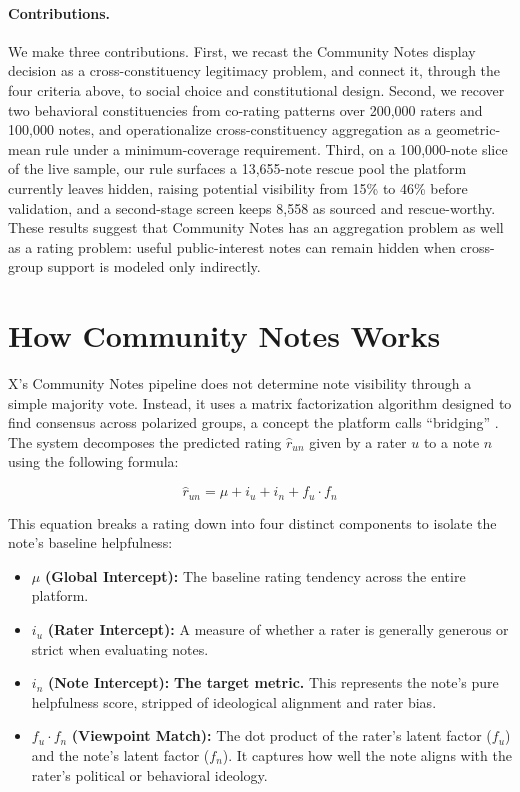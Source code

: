 \documentclass[10pt,twocolumn]{article}
\begin{document}
\paragraph{Contributions.} We make three contributions. First, we recast the
Community Notes display decision as a cross-constituency legitimacy problem, and
connect it, through the four criteria above, to social choice and constitutional
design. Second, we recover two behavioral constituencies from co-rating patterns
over 200,000 raters and 100,000 notes, and operationalize cross-constituency
aggregation as a geometric-mean rule under a minimum-coverage requirement. Third,
on a 100,000-note slice of the live sample, our rule surfaces a 13,655-note rescue
pool the platform currently leaves hidden, raising potential visibility from 15\%
to 46\% before validation, and a second-stage screen keeps 8,558 as sourced and
rescue-worthy. These results suggest that Community Notes has an
aggregation problem as well as a rating problem: useful public-interest notes can
remain hidden when cross-group support is modeled only indirectly.

\section{How Community Notes Works}
\label{sec:how_cn_works}

X's Community Notes pipeline does not determine note visibility through a simple majority vote. Instead, it uses a matrix factorization algorithm designed to find consensus across polarized groups, a concept the platform calls ``bridging'' \cite{wojcik2022birdwatch}. The system decomposes the predicted rating $\hat{r}_{un}$ given by a rater $u$ to a note $n$ using the following formula:

\begin{equation}
    \hat{r}_{un} = \mu + i_u + i_n + f_u \cdot f_n
    \label{eq:cn-model}
\end{equation}

This equation breaks a rating down into four distinct components to isolate the note's baseline helpfulness:
\begin{itemize}
    \item $\mu$ \textbf{(Global Intercept):} The baseline rating tendency across the entire platform.
    \item $i_u$ \textbf{(Rater Intercept):} A measure of whether a rater is generally generous or strict when evaluating notes.
    \item $i_n$ \textbf{(Note Intercept):} \textbf{The target metric.} This represents the note's pure helpfulness score, stripped of ideological alignment and rater bias.
    \item $f_u \cdot f_n$ \textbf{(Viewpoint Match):} The dot product of the rater's latent factor ($f_u$) and the note's latent factor ($f_n$). It captures how well the note aligns with the rater's political or behavioral ideology.
\end{itemize}
\end{document}
